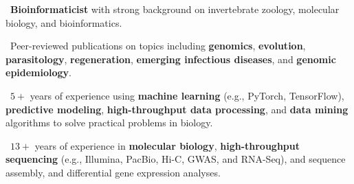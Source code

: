 \documentclass[11pt, letterpaper, sans]{moderncv}
\begin{document}
\thispagestyle{empty}\maketitle


\vspace{-3em}

\textbullet~\textbf{Bioinformaticist} with strong background on invertebrate zoology, molecular biology, and bioinformatics.

\textbullet~Peer-reviewed publications on topics including \textbf{genomics}, \textbf{evolution}, \textbf{parasitology}, \textbf{regeneration}, \textbf{emerging infectious diseases}, and \textbf{genomic epidemiology}.

\textbullet~$5+$ years of experience using \textbf{machine learning} (e.g., PyTorch, TensorFlow), \textbf{predictive modeling}, \textbf{high-throughput data processing}, and \textbf{data mining} algorithms to solve practical problems in biology.

\textbullet~$13+$ years of experience in \textbf{molecular biology}, \textbf{high-throughput sequencing} (e.g., Illumina, PacBio, Hi-C, GWAS, and RNA-Seq), and sequence assembly, and differential gene expression analyses.


\vspace{-0.5em}
\end{document}
